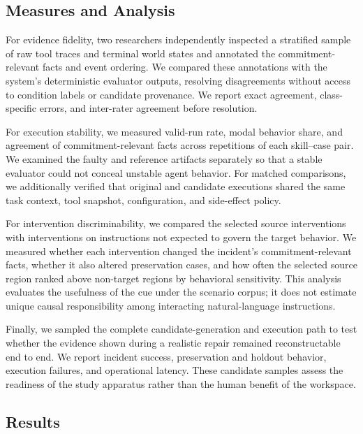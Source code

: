 \subsection{Measures and Analysis}

For evidence fidelity, two researchers independently inspected a stratified
sample of raw tool traces and terminal world states and annotated the
commitment-relevant facts and event ordering. We compared these annotations
with the system's deterministic evaluator outputs, resolving disagreements
without access to condition labels or candidate provenance. We report exact
agreement, class-specific errors, and inter-rater agreement before resolution.

For execution stability, we measured valid-run rate, modal behavior share, and
agreement of commitment-relevant facts across repetitions of each
skill--case pair. We examined the faulty and reference artifacts separately so
that a stable evaluator could not conceal unstable agent behavior. For matched
comparisons, we additionally verified that original and candidate executions
shared the same task context, tool snapshot, configuration, and side-effect
policy.

For intervention discriminability, we compared the selected source
interventions with interventions on instructions not expected to govern the
target behavior. We measured whether each intervention changed the incident's
commitment-relevant facts, whether it also altered preservation cases, and how
often the selected source region ranked above non-target regions by behavioral
sensitivity. This analysis evaluates the usefulness of the cue under the
scenario corpus; it does not estimate unique causal responsibility among
interacting natural-language instructions.

Finally, we sampled the complete candidate-generation and execution path to
test whether the evidence shown during a realistic repair remained
reconstructable end to end. We report incident success, preservation and
holdout behavior, execution failures, and operational latency. These candidate
samples assess the readiness of the study apparatus rather than the human
benefit of the workspace.

\subsection{Results}

